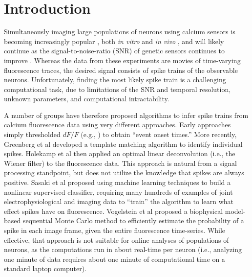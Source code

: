 \section{Introduction}


Simultaneously imaging large populations of neurons using calcium sensors is becoming increasingly popular \cite{ImagingManual}, both \emph{in vitro} \cite{SmettersYuste99, IkegayaYuste04} and \emph{in vivo} \cite{NagayamaChen07, GobelHelmchen07, LuoSvoboda08}, and will likely continue as the signal-to-noise-ratio (SNR) of genetic sensors continues to improve \cite{GaraschukKonnerth07, MankGriesbeck08b, WallaceHasan08}.  Whereas the data from these experiments are movies of time-varying fluorescence traces, the desired signal consists of spike trains of the observable neurons. Unfortunately, finding the most likely spike train is a challenging computational task, due to limitations of the SNR and temporal resolution, unknown parameters, and computational intractability. %

A number of groups have therefore proposed algorithms to infer spike trains from calcium fluorescence data using very different approaches.  Early approaches simply thresholded $dF/F$ (e.g., \cite{Schwartz98,Mao01}) to obtain ``event onset times.''  More recently, Greenberg et al \cite{GreenbergKerr08} developed a  template matching algorithm to identify individual spikes. %
Holekamp et al \cite{HolekampHoly08} then applied an optimal linear deconvolution (i.e., the Wiener filter) to the fluorescence data.  This approach is natural from a signal processing standpoint, but does not utilize the knowledge that spikes are always positive.  Sasaki et al \cite{SasakiIkegaya08} proposed using machine learning techniques to build a nonlinear supervised classifier, requiring many hundreds of examples of joint electrophysiological and imaging data to ``train'' the algorithm to learn what effect spikes have on fluorescence.  Vogelstein et al \cite{VogelsteinPaninski09} proposed a biophysical model-based sequential Monte Carlo method to efficiently estimate the probability of a spike in each image frame, given the entire fluorescence time-series.  While effective, that approach is not suitable for online analyses of populations of neurons, as the computations run in about real-time per neuron (i.e., analyzing one minute of data requires about one minute of computational time on a standard laptop computer).

